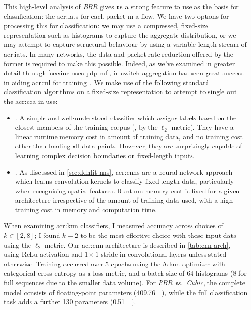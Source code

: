 This high-level analysis of \emph{BBR} gives us a strong feature to use as the basis for classification: the \glspl{acr:iat} for each packet in a flow.
We have two options for processing this for classification: we may use a compressed, fixed-size representation such as histograms to capture the aggregate distribution, or we may attempt to capture structural behaviour by using a variable-length stream of \glspl{acr:iat}.
In many networks, the data and packet rate reduction offered by the former is required to make this possible.
Indeed, as we've examined in greater detail through \cref{sec:inc-uses-pdp-ml}, in-switch aggregation has seen great success in aiding \gls{acr:ml} for training~\parencite{DBLP:conf/isca/LiLYCSH19}.
We make use of the following standard classification algorithms on a fixed-size representation to attempt to single out the \gls{acr:cca} in use:

\begin{itemize}
    \item {}. A simple and well-understood classifier which assigns labels based on the closest members of the training corpus (\ie, by the $\ell_2$ metric). They have a linear runtime memory cost in amount of training data, and no training cost other than loading all data points. However, they are surprisingly capable of learning complex decision boundaries on fixed-length inputs.
    
    \item {}. As discussed in \cref{sec:ddnlit-nns}, \glspl{acr:cnn} are a neural network approach which learns convolution kernels to classify fixed-length data, particularly when recognising spatial features. Runtime memory cost is fixed for a given architecture irrespective of the amount of training data used, with a high training cost in memory and computation time.
\end{itemize}

When examining \gls{acr:knn} classifiers, I measured accuracy across choices of $k \in \left[2, 8\right]$; I found $k=2$ to be the most effective choice with these input data using the $\ell_2$ metric.
Our \gls{acr:cnn} architecture is described in \cref{tab:cnn-arch}, using ReLu activation and $1 \times 1$ stride in convolutional layers unless stated otherwise.
Training occurred over 5 epochs using the Adam optimiser with categorical cross-entropy as a loss metric, and a batch size of \num{64} histograms (\num{8} for full sequences due to the smaller data volume).
For \emph{BBR vs.\ Cubic}, the complete model consists of  floating-point parameters (\qty{409.76}{\kibi\byte}), while the full classification task adds a further \num{130} parameters (\qty{0.51}{\kibi\byte}).

